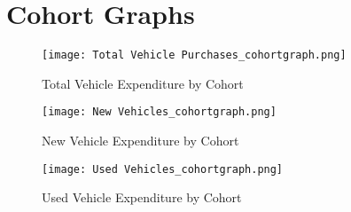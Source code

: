 \documentclass[12pt] {article}
\begin{document}
\section{Cohort Graphs}

\FloatBarrier

\begin{figure}
\caption{Total Vehicle Expenditure by Cohort}
\texttt{[image: Total Vehicle Purchases\_cohortgraph.png]}

\end{figure}

\begin{figure}
\caption{New Vehicle Expenditure by Cohort}
\texttt{[image: New Vehicles\_cohortgraph.png]}

\end{figure}


\begin{figure}
\caption{Used Vehicle Expenditure by Cohort}
\texttt{[image: Used Vehicles\_cohortgraph.png]}

\end{figure}
\end{document}
